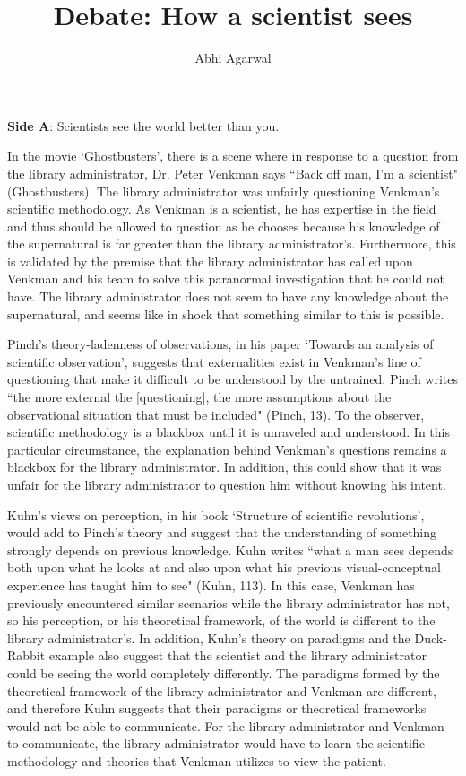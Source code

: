 \documentclass[11pt, oneside]{article}
\title{Debate: How a scientist sees\vspace{-0.4cm}}
\author{Abhi Agarwal\vspace{-1cm}}
\date{}
\begin{document}
\maketitle

\noindent \textbf{Side A}: Scientists see the world better than you.

\par In the movie `Ghostbusters', there is a scene where in response to a question from the library administrator, Dr. Peter Venkman says ``Back off man, I'm a scientist" (Ghostbusters). The library administrator was unfairly questioning Venkman's scientific methodology. As Venkman is a scientist, he has expertise in the field and thus should be allowed to question as he chooses because his knowledge of the supernatural is far greater than the library administrator's. Furthermore, this is validated by the premise that the library administrator has called upon Venkman and his team to solve this paranormal investigation that he could not have. The library administrator does not seem to have any knowledge about the supernatural, and seems like in shock that something similar to this is possible.
\par Pinch's theory-ladenness of observations, in his paper `Towards an analysis of scientific observation', suggests that externalities exist in Venkman's line of questioning that make it difficult to be understood by the untrained. Pinch writes ``the more external the [questioning], the more assumptions about the observational situation that must be included" (Pinch, 13). To the observer, scientific methodology is a blackbox until it is unraveled and understood. In this particular circumstance, the explanation behind Venkman's questions remains a blackbox for the library administrator. In addition, this could show that it was unfair for the library administrator to question him without knowing his intent.
\par Kuhn's views on perception, in his book `Structure of scientific revolutions', would add to Pinch's theory and suggest that the understanding of something strongly depends on previous knowledge. Kuhn writes ``what a man sees depends both upon what he looks at and also upon what his previous visual-conceptual experience has taught him to see" (Kuhn, 113). In this case, Venkman has previously encountered similar scenarios while the library administrator has not, so his perception, or his theoretical framework, of the world is different to the library administrator's. In addition, Kuhn's theory on paradigms and the Duck-Rabbit example also suggest that the scientist and the library administrator could be seeing the world completely differently. The paradigms formed by the theoretical framework of the library administrator and Venkman are different, and therefore Kuhn suggests that their paradigms or theoretical frameworks would not be able to communicate. For the library administrator and Venkman to communicate, the library administrator would have to learn the scientific methodology and theories that Venkman utilizes to view the patient.
\end{document}
